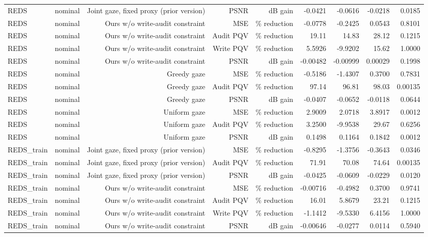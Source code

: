 \begin{table}[t]
\begin{tabular}{llrrrrrrr}
REDS & nominal & Joint gaze, fixed proxy (prior version) & PSNR & dB gain & -0.0421 & -0.0616 & -0.0218 & 0.0185 \\
REDS & nominal & Ours w/o write-audit constraint & MSE & \% reduction & -0.0778 & -0.2425 & 0.0543 & 0.8101 \\
REDS & nominal & Ours w/o write-audit constraint & Audit PQV & \% reduction & 19.11 & 14.83 & 28.12 & 0.1215 \\
REDS & nominal & Ours w/o write-audit constraint & Write PQV & \% reduction & 5.5926 & -9.9202 & 15.62 & 1.0000 \\
REDS & nominal & Ours w/o write-audit constraint & PSNR & dB gain & -0.00482 & -0.00999 & 0.00029 & 0.1998 \\
REDS & nominal & Greedy gaze & MSE & \% reduction & -0.5186 & -1.4307 & 0.3700 & 0.7831 \\
REDS & nominal & Greedy gaze & Audit PQV & \% reduction & 97.14 & 96.81 & 98.03 & 0.00135 \\
REDS & nominal & Greedy gaze & PSNR & dB gain & -0.0407 & -0.0652 & -0.0118 & 0.0644 \\
REDS & nominal & Uniform gaze & MSE & \% reduction & 2.9009 & 2.0718 & 3.8917 & 0.0012 \\
REDS & nominal & Uniform gaze & Audit PQV & \% reduction & 3.2500 & -9.9538 & 29.67 & 0.6256 \\
REDS & nominal & Uniform gaze & PSNR & dB gain & 0.1498 & 0.1164 & 0.1842 & 0.0012 \\
REDS\_train & nominal & Joint gaze, fixed proxy (prior version) & MSE & \% reduction & -0.8295 & -1.3756 & -0.3643 & 0.0346 \\
REDS\_train & nominal & Joint gaze, fixed proxy (prior version) & Audit PQV & \% reduction & 71.91 & 70.08 & 74.64 & 0.00135 \\
REDS\_train & nominal & Joint gaze, fixed proxy (prior version) & PSNR & dB gain & -0.0425 & -0.0609 & -0.0229 & 0.0120 \\
REDS\_train & nominal & Ours w/o write-audit constraint & MSE & \% reduction & -0.00716 & -0.4982 & 0.3700 & 0.9741 \\
REDS\_train & nominal & Ours w/o write-audit constraint & Audit PQV & \% reduction & 16.01 & 5.8679 & 23.21 & 0.1215 \\
REDS\_train & nominal & Ours w/o write-audit constraint & Write PQV & \% reduction & -1.1412 & -9.5330 & 6.4156 & 1.0000 \\
REDS\_train & nominal & Ours w/o write-audit constraint & PSNR & dB gain & -0.00646 & -0.0277 & 0.0114 & 0.5940 \\

\end{tabular}
\end{table}
